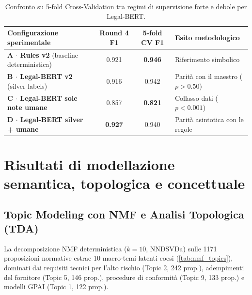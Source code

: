 \documentclass[12pt,a4paper,oneside]{report}
\begin{document}
\begin{table}[htbp]
  \centering
  \small
  \caption[Confronto 5-fold Cross-Validation tra regimi di supervisione]{Confronto su 5-fold Cross-Validation tra regimi di supervisione forte e debole per Legal-BERT.}
  \label{tab:bert_controllo}
  \begin{tabular}{p{4.8cm} c c p{3.6cm}}
    \toprule
    \textbf{Configurazione sperimentale} & \textbf{Round 4 F1} & \textbf{5-fold CV F1} & \textbf{Esito metodologico} \\
    \midrule
    \textbf{A $\cdot$ Rules v2} (baseline deterministica) & \num{0,921} & \textbf{\num{0,946}} & Riferimento simbolico \\
    \textbf{B $\cdot$ Legal-BERT v2} (silver labels) & \num{0,916} & \num{0,942} & Parità con il maestro ($p > \num{0,50}$) \\
    \textbf{C $\cdot$ Legal-BERT sole note umane} & \num{0,857} & \textbf{\num{0,821}} & Collasso dati ($p < \num{0,001}$) \\
    \textbf{D $\cdot$ Legal-BERT silver + umane} & \textbf{\num{0,927}} & \num{0,940} & Parità asintotica con le regole \\
    \bottomrule
  \end{tabular}
\end{table}


\section{Risultati di modellazione semantica, topologica e concettuale}
\label{sec: risultati_semantica_topologica}

\subsection{Topic Modeling con NMF e Analisi Topologica (TDA)}
La decomposizione NMF deterministica ($k=10$, NNDSVDa) sulle \num{1171} proposizioni normative estrae 10 macro-temi latenti coesi (\cref{tab:nmf_topics}), dominati dai requisiti tecnici per l'alto rischio (Topic 2, 242 prop.), adempimenti del fornitore (Topic 5, 146 prop.), procedure di conformità (Topic 9, 133 prop.) e modelli GPAI (Topic 1, 122 prop.).
\end{document}

